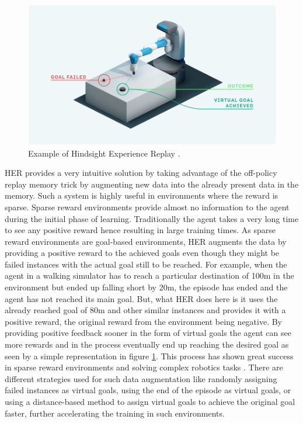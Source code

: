 \begin{figure}[h!]
    \centering
    \includegraphics[width=\textwidth]{images/HER.png}
    \caption{Example of Hindsight Experience Replay \cite{andrychowicz2018hindsight} \cite{plappert2018multigoal}.}
    \label{fig:HER}
\end{figure}

HER provides a very intuitive solution by taking advantage of the off-policy replay memory trick by augmenting new data into the already present data in the memory. Such a system is highly useful in environments where the reward is sparse. Sparse reward environments provide almost no information to the agent during the initial phase of learning. Traditionally the agent takes a very long time to see any positive reward hence resulting in large training times. As sparse reward environments are goal-based environments, HER augments the data by providing a positive reward to the achieved goals even though they might be failed instances with the actual goal still to be reached. For example, when the agent in a walking simulator has to reach a particular destination of 100m in the environment but ended up falling short by 20m, the episode has ended and the agent has not reached its main goal. But, what HER does here is it uses the already reached goal of 80m and other similar instances and provides it with a positive reward, the original reward from the environment being negative. By providing positive feedback sooner in the form of virtual goals the agent can see more rewards and in the process eventually end up reaching the desired goal as seen by a simple representation in figure \ref{fig:HER}. This process has shown great success in sparse reward environments and solving complex robotics tasks \cite{plappert2018multigoal}. There are different strategies used for such data augmentation like randomly assigning failed instances as virtual goals, using the end of the episode as virtual goals, or using a distance-based method \cite{HERER} to assign virtual goals to achieve the original goal faster, further accelerating the training in such environments. \\

